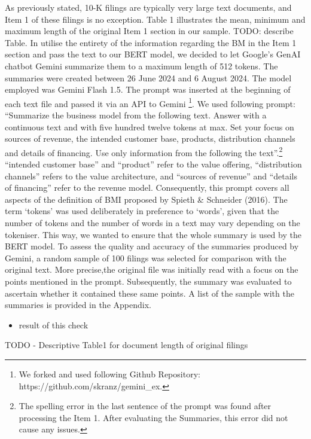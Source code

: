 \documentclass[
]{article}
\providecommand{\tightlist}{%
  \setlength{\itemsep}{0pt}\setlength{\parskip}{0pt}}\usepackage{longtable,booktabs,array}
\begin{document}
As previously stated, 10-K filings are typically very large text
documents, and Item 1 of these filings is no exception. Table 1
illustrates the mean, minimum and maximum length of the original Item 1
section in our sample. TODO: describe Table. In utilise the entirety of
the information regarding the BM in the Item 1 section and pass the text
to our BERT model, we decided to let Google's GenAI chatbot Gemini
summarize them to a maximum length of 512 tokens. The summaries were
created between 26 June 2024 and 6 August 2024. The model employed was
Gemini Flash 1.5. The prompt was inserted at the beginning of each text
file and passed it via an API to Gemini \footnote{We forked and used
  following Github Repository: https://github.com/skranz/gemini\_ex.}.
We used following prompt: ``Summarize the business model from the
following text. Answer with a continuous text and with five hundred
twelve tokens at max. Set your focus on sources of revenue, the intended
customer base, products, distribution channels and details of financing.
Use only information from the following the text''.\footnote{The
  spelling error in the last sentence of the prompt was found after
  processing the Item 1. After evaluating the Summaries, this error did
  not cause any issues.} ``intended customer base'' and ``product''
refer to the value offering, ``distribution channels'' refers to the
value architecture, and ``sources of revenue'' and ``details of
financing'' refer to the revenue model. Consequently, this prompt covers
all aspects of the definition of BMI proposed by Spieth \& Schneider
(2016). The term `tokens' was used deliberately in preference to
`words', given that the number of tokens and the number of words in a
text may vary depending on the tokeniser. This way, we wanted to ensure
that the whole summary is used by the BERT model. To assess the quality
and accuracy of the summaries produced by Gemini, a random sample of 100
filings was selected for comparison with the original text. More
precise,the original file was initially read with a focus on the points
mentioned in the prompt. Subsequently, the summary was evaluated to
ascertain whether it contained these same points. A list of the sample
with the summaries is provided in the Appendix.

\begin{itemize}
\tightlist
\item
  result of this check
\end{itemize}

TODO - Descriptive Table1 for document length of original filings
\end{document}
